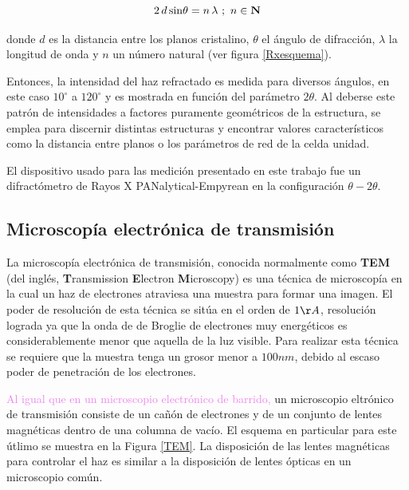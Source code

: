 \documentclass[12pt]{article}
\theoremstyle{definition}
\theoremstyle{remark}
\begin{document}
{\begin{equation}
 2 \, d\, {\rm sin} \theta =n \, \lambda \, \,; \, \, n \in \mathbf{N}
 \end{equation}
 
  \noindent donde $d$ es la distancia entre los planos cristalino, $\theta$ el ángulo de difracción, $\lambda$ la longitud de onda y $n$ un número natural (ver figura \ref{Rxesquema}).
 
 Entonces, la intensidad del haz refractado es medida para diversos ángulos, en este caso $10^{\circ}$ a $120^{\circ}$ y es mostrada en función del parámetro $2\theta$. Al deberse este patrón de intensidades  a factores puramente geométricos de la estructura, se emplea para discernir distintas estructuras y encontrar valores característicos como la distancia entre planos o los parámetros de red de la celda unidad.

 El dispositivo usado para las medición presentado en este trabajo fue un difractómetro de Rayos X PANalytical-Empyrean en la configuración $\theta - 2\theta$.
 
\subsection{Microscopía electrónica de transmisión}
La microscopía electrónica de transmisión, conocida normalmente como \textbf{TEM} (del inglés, \textbf{T}ransmission \textbf{E}lectron \textbf{M}icroscopy) es una técnica de microscopía en la cual un haz de electrones atraviesa una muestra para formar una imagen. El poder de resolución de esta técnica se sitúa en el orden de $1 \AA$, resolución lograda ya que la onda de de Broglie de electrones muy energéticos es considerablemente menor que aquella de la luz visible. Para realizar esta técnica se requiere que la muestra tenga un grosor menor a $100 nm$, debido al escaso poder de penetración de los electrones.

\textcolor{violet}
{Al igual que en un microscopio electrónico de barrido,} un microscopio eltrónico de transmisión consiste de un cañón de electrones y de un conjunto de lentes magnéticas dentro de una columna de vacío. El esquema en particular para este útlimo se muestra en la Figura \ref{TEM}. La disposición de las lentes magnéticas para controlar el haz es similar a la disposición de lentes ópticas en un microscopio común.

}
\end{document}
